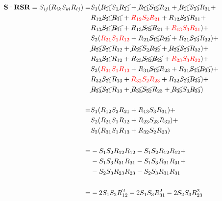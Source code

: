 \begin{subequations}
\begin{align}
        \mathbf{S}:\mathbf{RSR} = S_{ij}(R_{ik}S_{kl} R_{lj}) = &
                S_{1}(
                \cancel{R_{11}}S_{1}\cancel{R_{11}}+ \cancel{R_{11}}\cancel{S_{12}}R_{21} + \cancel{R_{11}}\cancel{S_{13}}R_{31} +   \notag		\\
            &   R_{12}\cancel{S_{21}}\cancel{R_{11}}+ {\color{red}R_{12}S_{2}R_{21}} + R_{12}\cancel{S_{23}}R_{31} +   \notag		\\
            &   R_{13}\cancel{S_{31}}\cancel{R_{11}}+ R_{13}\cancel{S_{32}}R_{21} + {\color{red}R_{13}S_{3}R_{31}}) 
            +    \notag		\\
            &   S_{2}(
                {\color{red}R_{21}S_{1}R_{12} }+ R_{21}\cancel{S_{12}}\cancel{R_{22}} + R_{21}\cancel{S_{13}}R_{32}) +  		\\
            &   \cancel{R_{22}}\cancel{S_{21}}R_{12}+ \cancel{R_{22}}S_{2}\cancel{R_{22}} + \cancel{R_{22}}\cancel{S_{23}}R_{32}) +  \notag		\\
            &   R_{23}\cancel{S_{31}}R_{12}+ R_{23}\cancel{S_{32}}\cancel{R_{22}} + {\color{red}R_{23}S_{3}R_{32}}) +   \notag		\\
            &   S_{3}(
                {\color{red}R_{31}S_{1}R_{13}} + R_{31}\cancel{S_{12}}R_{23} + R_{31}\cancel{S_{13}}\cancel{R_{33}}) +  \notag		\\
            &   R_{32}\cancel{S_{21}}R_{13}+ {\color{red}R_{32}S_{2}R_{23}} + R_{32}\cancel{S_{23}}\cancel{R_{33}}) +  \notag		\\
            &   \cancel{R_{33}}\cancel{S_{31}}R_{13}+ \cancel{R_{33}}\cancel{S_{32}}R_{23} + \cancel{R_{33}}S_{3}\cancel{R_{33}})   \notag \\
\notag		\\
            = &
                S_{1}(R_{12}S_{2}R_{21} + R_{13} S_{3} R_{31})   +   \notag		\\
            &   S_{2}(R_{21} S_{1} R_{12} + R_{23} S_{23} R_{32}) +   		\\
            &   S_{3}(R_{31}S_{1}R_{13} + R_{32} S_{2} R_{23})      \notag  \\
\notag  \\
            = &
            -S_{1} S_{2} R_{12} R_{12} - S_{1} S_{2} R_{12} R_{12} +    \notag \\
            &   -S_{1} S_{3} R_{31} R_{31} - S_{1} S_{3} R_{31} R_{31} +    \\
            &    -S_{2} S_{3} R_{23} R_{23} - S_{2} S_{3} R_{31} R_{31} \notag \\    
\notag  \\ 
     = & 
    -2 S_{1} S_{2} R_{12}^2 -2 S_{1}S_{3} R_{31}^2 - 2 S_{2} S_{3} R_{23}^2
\end{align}
    \label{eq:c5-term}
\end{subequations}

